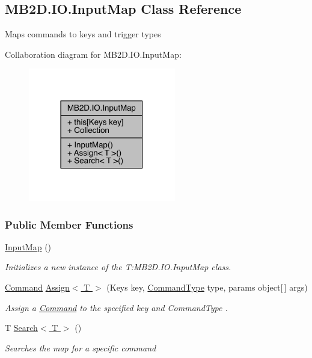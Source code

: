 \hypertarget{class_m_b2_d_1_1_i_o_1_1_input_map}{}\subsection{M\+B2\+D.\+I\+O.\+Input\+Map Class Reference}
\label{class_m_b2_d_1_1_i_o_1_1_input_map}


Maps commands to keys and trigger types  




Collaboration diagram for M\+B2\+D.\+I\+O.\+Input\+Map\+:
\nopagebreak
\begin{figure}[H]
\begin{center}
\leavevmode
\includegraphics[width=182pt]{class_m_b2_d_1_1_i_o_1_1_input_map__coll__graph}
\end{center}
\end{figure}
\subsubsection*{Public Member Functions}
\begin{DoxyCompactItemize}
\item 
\hyperlink{class_m_b2_d_1_1_i_o_1_1_input_map_a37cd0d946d9a15c9a5ce96d5ca2ca8f1}{Input\+Map} ()
\begin{DoxyCompactList}\small\item\em Initializes a new instance of the T\+:\+M\+B2\+D.\+I\+O.\+Input\+Map class. \end{DoxyCompactList}\item 
\hyperlink{class_m_b2_d_1_1_i_o_1_1_command}{Command} \hyperlink{class_m_b2_d_1_1_i_o_1_1_input_map_a07131c13b291c957512c08aa0d814890}{Assign$<$ T $>$} (Keys key, \hyperlink{namespace_m_b2_d_1_1_i_o_ab5f95f3fe9e652778b62bdf943168a68}{Command\+Type} type, params object\mbox{[}$\,$\mbox{]} args)
\begin{DoxyCompactList}\small\item\em Assign a \hyperlink{class_m_b2_d_1_1_i_o_1_1_command}{Command} to the specified key and Command\+Type . \end{DoxyCompactList}\item 
T \hyperlink{class_m_b2_d_1_1_i_o_1_1_input_map_ae5537db7c751ba05196cc71d5f98bf87}{Search$<$ T $>$} ()
\begin{DoxyCompactList}\small\item\em Searches the map for a specific command \end{DoxyCompactList}\end{DoxyCompactItemize}
